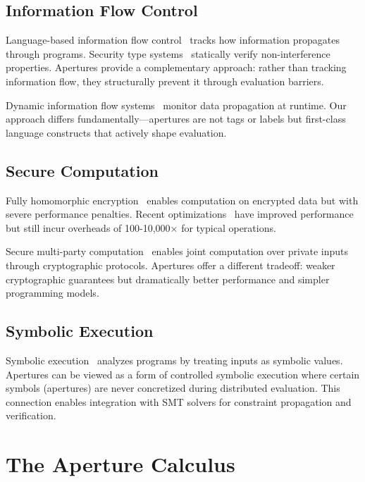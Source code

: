 \documentclass[12pt]{article}
\begin{document}
\subsection{Information Flow Control}

Language-based information flow control~\cite{sabelfeld2003language} tracks how information propagates through programs. Security type systems~\cite{volpano1996sound} statically verify non-interference properties. Apertures provide a complementary approach: rather than tracking information flow, they structurally prevent it through evaluation barriers.

Dynamic information flow systems~\cite{austin2009efficient} monitor data propagation at runtime. Our approach differs fundamentally—apertures are not tags or labels but first-class language constructs that actively shape evaluation.

\subsection{Secure Computation}

Fully homomorphic encryption~\cite{gentry2009fully} enables computation on encrypted data but with severe performance penalties. Recent optimizations~\cite{cheon2017homomorphic} have improved performance but still incur overheads of 100-10,000× for typical operations.

Secure multi-party computation~\cite{goldreich1987play} enables joint computation over private inputs through cryptographic protocols. Apertures offer a different tradeoff: weaker cryptographic guarantees but dramatically better performance and simpler programming models.

\subsection{Symbolic Execution}

Symbolic execution~\cite{king1976symbolic} analyzes programs by treating inputs as symbolic values. Apertures can be viewed as a form of controlled symbolic execution where certain symbols (apertures) are never concretized during distributed evaluation. This connection enables integration with SMT solvers for constraint propagation and verification.

\section{The Aperture Calculus}
\end{document}
